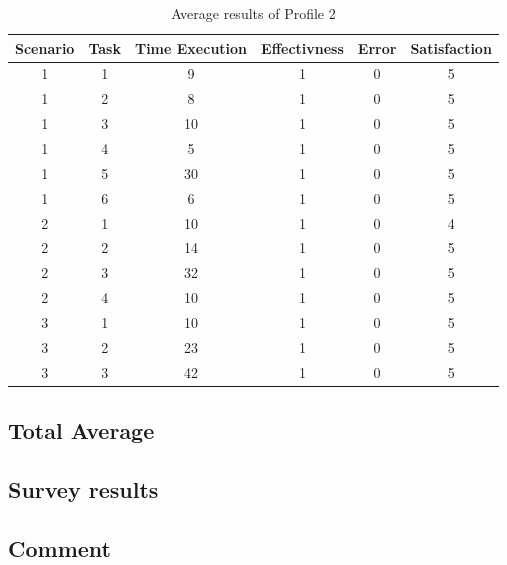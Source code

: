 \begin{table}[H]
  \begin{center}
    \begin{tabular}{||c|c|c|c|c|c||} %
      \textbf{Scenario} & \textbf{Task} & \textbf{Time Execution} & \textbf{Effectivness} & \textbf{Error} & \textbf{Satisfaction}\\
      
      \hline
        1 & 1 & 9 & 1 & 0 & 5\\
        1 & 2 & 8 & 1 & 0 & 5\\
        1 & 3 & 10 & 1 & 0 & 5\\
        1 & 4 & 5 & 1 & 0 & 5\\
        1 & 5 & 30 & 1 & 0 & 5\\
        1 & 6 & 6 & 1 & 0 & 5\\
        \hline
        2 & 1 & 10 & 1 & 0 & 4\\
        2 & 2 & 14 & 1 & 0 & 5\\
        2 & 3 & 32 & 1 & 0 & 5\\
        2 & 4 & 10 & 1 & 0 & 5\\
        \hline
        3 & 1 & 10 & 1 & 0 & 5\\
        3 & 2 & 23 & 1 & 0 & 5\\
        3 & 3 & 42 & 1 & 0 & 5\\
        \hline

    \end{tabular}
  \end{center}
  \caption{Average results of Profile 2}
\end{table}

\subsection{Total Average}
\begin{figure}[H]
  \centering
\end{figure}


\subsection{Survey results}

\subsection{Comment}




